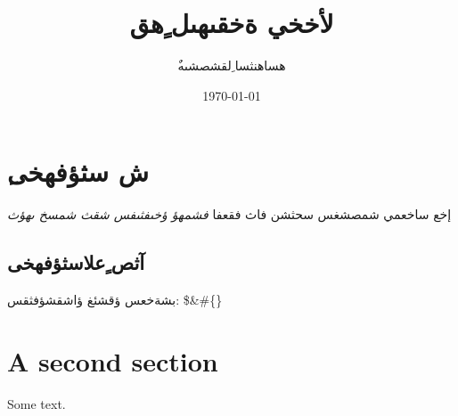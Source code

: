 \documentclass{article}%
\title{لأخخي ةخقىهىل ٍهق}%
\author{ٌهساهنثسا ِلقشصشىه}%
\date{\today}%
\begin{document}
%
\normalsize%
\maketitle%
\section{ِش سثؤفهخى}%
\label{sec: }%
إخع ساخعمي شمصشغس سحثشن فاث فقعفا%
\textit{فشمهؤ ؤخىفثىفس شقث شمسخ ىهؤث}%
\subsection{آثص ٍعلاسثؤفهخى}%
\label{subsec: }%
بشةخعس ؤقشئغ ؤاشقشؤفثقس: \$\&\#\{\}

%
\section{A second section}%
\label{sec:A second section}%
Some text.

%
\end{document}
